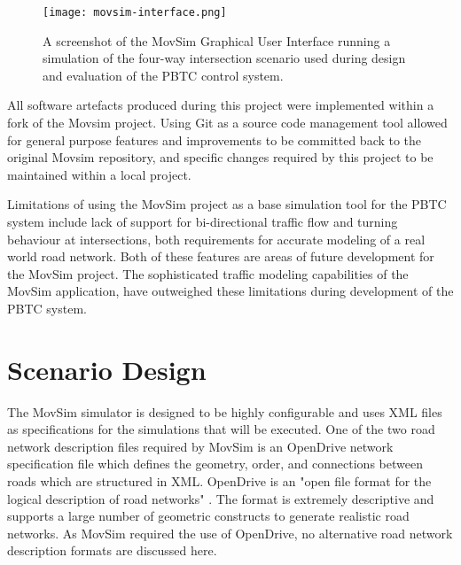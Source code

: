 \begin{figure}[]
\centering
	\texttt{[image: movsim-interface.png]}
	\caption{ A screenshot of the MovSim Graphical User Interface running a simulation of the four-way intersection scenario used during design and evaluation of the PBTC control system. }
\label{intersectiondiagram}
\end{figure}


All software artefacts produced during this project were implemented within a fork of the Movsim project. Using Git as a source code management tool allowed for general purpose features and improvements to be committed back to the original Movsim repository, and specific changes required by this project to be maintained within a local project.

Limitations of using the MovSim project as a base simulation tool for the PBTC system include lack of support for bi-directional traffic flow and turning behaviour at intersections, both requirements for accurate modeling of a real world road network. Both of these features are areas of future development for the MovSim project. The sophisticated traffic modeling capabilities of the MovSim application, have outweighed these limitations during development of the PBTC system.


\section{Scenario Design}

The MovSim simulator is designed to be highly configurable and uses XML files as specifications for the simulations that will be executed. One of the two road network description files required by MovSim is an OpenDrive network specification file which defines the geometry, order, and connections between roads which are structured in XML. OpenDrive is an "open file format for the logical description of road networks" \cite{opendrive}. The format is extremely descriptive and supports a large number of geometric constructs to generate realistic road networks. As MovSim required the use of OpenDrive, no alternative road network description formats are discussed here.

